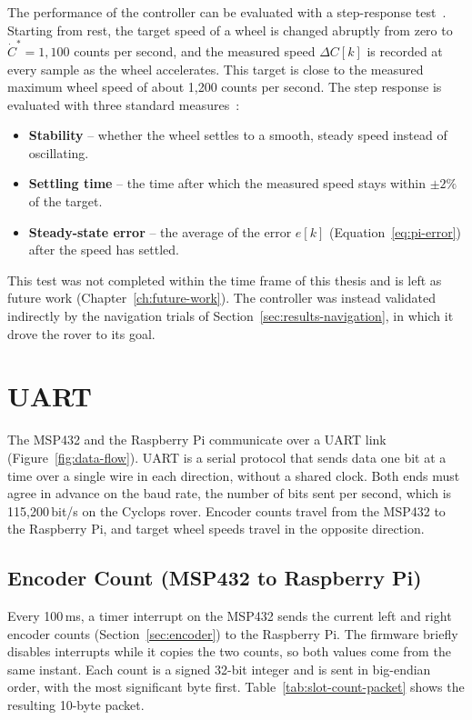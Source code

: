 The performance of the controller can be evaluated with a step-response test~\cite{valvano}.
Starting from rest, the target speed of a wheel is changed abruptly from zero to
$\dot{C}^* = 1{,}100$ counts per second, and the measured speed $\Delta C[k]$ is recorded
at every sample as the wheel accelerates. This target is close to the measured maximum
wheel speed of about 1{,}200 counts per second. The step response is evaluated with three
standard measures~\cite{valvano}:
\begin{itemize}
  \item \textbf{Stability} -- whether the wheel settles to a smooth, steady speed instead
    of oscillating.
  \item \textbf{Settling time} -- the time after which the measured speed stays within
    $\pm 2\%$ of the target.
  \item \textbf{Steady-state error} -- the average of the error $e[k]$
    (Equation~\ref{eq:pi-error}) after the speed has settled.
\end{itemize}
This test was not completed within the time frame of this thesis and is left as future work
(Chapter~\ref{ch:future-work}). The controller was instead validated indirectly by the
navigation trials of Section~\ref{sec:results-navigation}, in which it drove the rover to its
goal.

\section{UART}
\label{sec:uart}

The MSP432 and the Raspberry Pi communicate over a UART link (Figure~\ref{fig:data-flow}).
UART is a serial protocol that sends data one bit at a time over a single wire in each
direction, without a shared clock. Both ends must agree in advance on the baud rate, the
number of bits sent per second, which is 115,200\,bit/s on the Cyclops rover.
Encoder counts travel from the MSP432 to the Raspberry Pi, and target wheel speeds travel
in the opposite direction.

\subsection{Encoder Count (MSP432 to Raspberry Pi)}
\label{sec:uart-slot-count}

Every 100\,ms, a timer interrupt on the MSP432 sends the current left and right encoder
counts (Section~\ref{sec:encoder}) to the Raspberry Pi. The firmware briefly disables
interrupts while it copies the two counts, so both values come from the same instant.
Each count is a signed 32-bit integer and is sent in big-endian order, with the most
significant byte first.
Table~\ref{tab:slot-count-packet} shows the resulting 10-byte packet.

